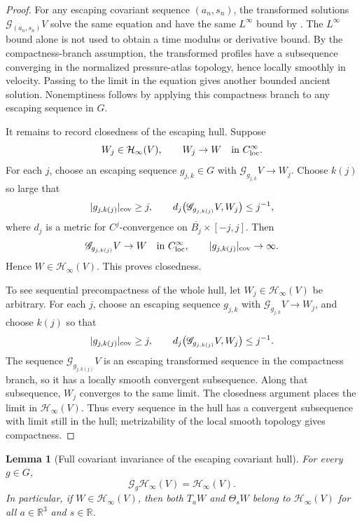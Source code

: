 \documentclass[11pt]{amsart}
\numberwithin{equation}{section}
\theoremstyle{plain}
\newtheorem{lemma}[lemma]{Lemma}
\theoremstyle{definition}
\theoremstyle{remark}
\newcommand{\loc}{\mathrm{loc}}
\newcommand{\calH}{\mathcal H}
\begin{document}
\begin{proof}
For any escaping covariant sequence \((a_n,s_n)\), the transformed solutions
\(\mathscr G_{(a_n,s_n)}V\) solve the same equation and have the same
\(L^\infty\) bound by
.  The
\(L^\infty\) bound alone is not used to obtain a time modulus or derivative
bound.  By the compactness-branch assumption, the transformed profiles have a
subsequence converging in the normalized pressure-atlas topology, hence locally
smoothly in velocity.  Passing to the limit in the equation gives another
bounded ancient solution.  Nonemptiness follows by applying this compactness
branch to any escaping sequence in \(G\).

It remains to record closedness of the escaping hull.  Suppose
\[
   W_j\in\calH_\infty(V),\qquad W_j\to W
   \quad\hbox{in }C^\infty_{\loc}.
\]
For each \(j\), choose an escaping sequence \(g_{j,k}\in G\) with
\(\mathscr G_{g_{j,k}}V\to W_j\).  Choose \(k(j)\) so large that
\[
   |g_{j,k(j)}|_{\rm cov}\ge j,
   \qquad
   d_j\!\left(\mathscr G_{g_{j,k(j)}}V,W_j\right)\le j^{-1},
\]
where \(d_j\) is a metric for \(C^j\)-convergence on
\(\overline{B_j}\times[-j,j]\).  Then
\[
   \mathscr G_{g_{j,k(j)}}V\to W
   \quad\hbox{in }C^\infty_{\loc},
   \qquad
   |g_{j,k(j)}|_{\rm cov}\to\infty .
\]
Hence \(W\in\calH_\infty(V)\).  This proves closedness.

To see sequential precompactness of the whole hull, let
\(W_j\in\calH_\infty(V)\) be arbitrary.  For each \(j\), choose an escaping
sequence \(g_{j,k}\) with \(\mathscr G_{g_{j,k}}V\to W_j\), and choose
\(k(j)\) so that
\[
   |g_{j,k(j)}|_{\rm cov}\ge j,\qquad
   d_j\!\left(\mathscr G_{g_{j,k(j)}}V,W_j\right)\le j^{-1}.
\]
The sequence \(\mathscr G_{g_{j,k(j)}}V\) is an escaping transformed sequence
in the compactness branch, so it has a locally smooth convergent subsequence.
Along that subsequence, \(W_j\) converges to the same limit.  The closedness
argument places the limit in \(\calH_\infty(V)\).
Thus every sequence in the hull has a convergent subsequence with limit still
in the hull; metrizability of the local smooth topology gives compactness.
\end{proof}

\begin{lemma}[Full covariant invariance of the escaping covariant hull]
\label{lem:escaping-covariant-hull-invariance}
For every \(g\in G\),
\[
   \mathscr G_g\calH_\infty(V)=\calH_\infty(V).
\]
In particular, if \(W\in\calH_\infty(V)\), then both \(T_aW\) and
\(\Theta_sW\) belong to \(\calH_\infty(V)\) for all \(a\in\mathbb R^3\) and
\(s\in\mathbb R\).
\end{lemma}
\end{document}
